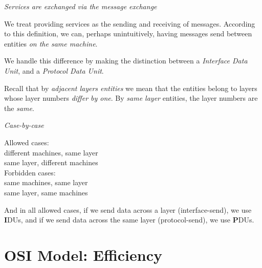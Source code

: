\frmrule 

\textit{Services are exchanged via the message exchange}


We treat providing services as the sending and receiving of messages. 
According to this definition, we can, perhaps unintuitively, 
having messages send between entities \textit{on the same machine}. 

We handle this difference by making the distinction between a \textit{Interface Data Unit}, 
and a \textit{Protocol Data Unit}.  


Recall that by \textit{adjacent layers entities} we mean that the entities 
belong to layers whose layer numbers \textit{differ by one}.
By \textit{same layer} entities, the layer numbers are the \textit{same}.


\frmrule 

\textit{Case-by-case}


Allowed cases:\\
different machines, same layer\\
same layer, different machines\\
Forbidden cases:\\
same machines, same layer\\
same layer, same machines\\



And in all allowed cases, if we send data across 
a layer (interface-send), we use \textbf{I}DUs,
and if we send data across the same layer (protocol-send), we use 
\textbf{P}DUs. 




\frmrule 





\section{OSI Model: Efficiency}


